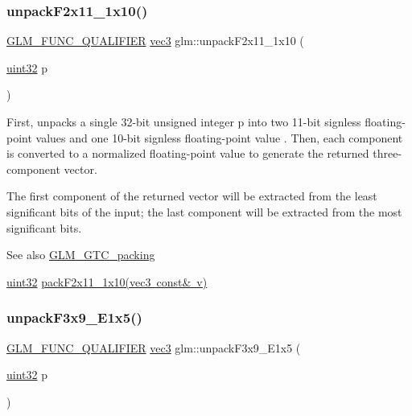 \subsubsection{\texorpdfstring{unpack\+F2x11\+\_\+1x10()}{unpackF2x11\_1x10()}}
{\footnotesize\ttfamily \mbox{\hyperlink{setup_8hpp_a33fdea6f91c5f834105f7415e2a64407}{G\+L\+M\+\_\+\+F\+U\+N\+C\+\_\+\+Q\+U\+A\+L\+I\+F\+I\+ER}} \mbox{\hyperlink{group__core__types_ga1c47e8b3386109bc992b6c48e91b0be7}{vec3}} glm\+::unpack\+F2x11\+\_\+1x10 (\begin{DoxyParamCaption}\item[{\mbox{\hyperlink{group__gtc__type__precision_ga202b6a53c105fcb7e531f9b443518451}{uint32}}}]{p }\end{DoxyParamCaption})}

First, unpacks a single 32-\/bit unsigned integer p into two 11-\/bit signless floating-\/point values and one 10-\/bit signless floating-\/point value . Then, each component is converted to a normalized floating-\/point value to generate the returned three-\/component vector.

The first component of the returned vector will be extracted from the least significant bits of the input; the last component will be extracted from the most significant bits.

\begin{DoxySeeAlso}{See also}
\mbox{\hyperlink{group__gtc__packing}{G\+L\+M\+\_\+\+G\+T\+C\+\_\+packing}} 

\mbox{\hyperlink{group__gtc__type__precision_ga202b6a53c105fcb7e531f9b443518451}{uint32}} \mbox{\hyperlink{group__gtc__packing_ga8c2a0eeee677ca4dafd9e093d9e81062}{pack\+F2x11\+\_\+1x10(vec3 const\& v)}} 
\end{DoxySeeAlso}
\mbox{\label{group__gtc__packing_ga15d8845a31e1e55d493803d0c8cb5910}} 
\subsubsection{\texorpdfstring{unpack\+F3x9\+\_\+\+E1x5()}{unpackF3x9\_E1x5()}}
{\footnotesize\ttfamily \mbox{\hyperlink{setup_8hpp_a33fdea6f91c5f834105f7415e2a64407}{G\+L\+M\+\_\+\+F\+U\+N\+C\+\_\+\+Q\+U\+A\+L\+I\+F\+I\+ER}} \mbox{\hyperlink{group__core__types_ga1c47e8b3386109bc992b6c48e91b0be7}{vec3}} glm\+::unpack\+F3x9\+\_\+\+E1x5 (\begin{DoxyParamCaption}\item[{\mbox{\hyperlink{group__gtc__type__precision_ga202b6a53c105fcb7e531f9b443518451}{uint32}}}]{p }\end{DoxyParamCaption})}

